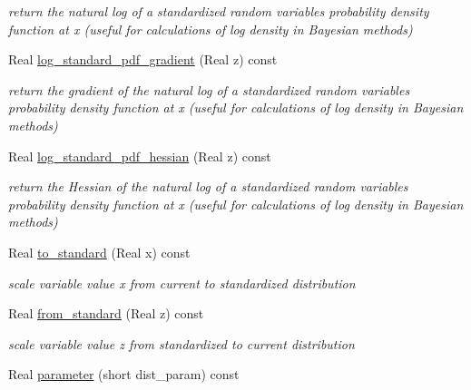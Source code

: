 \begin{DoxyCompactItemize}
\begin{DoxyCompactList}\small\item\em return the natural log of a standardized random variable\textquotesingle{}s probability density function at x (useful for calculations of log density in Bayesian methods) \end{DoxyCompactList}\item 
Real \hyperlink{classPecos_1_1NormalRandomVariable_a73ea75d51f5415f600bebbca4a9628b7}{log\+\_\+standard\+\_\+pdf\+\_\+gradient} (Real z) const \label{classPecos_1_1NormalRandomVariable_a73ea75d51f5415f600bebbca4a9628b7}

\begin{DoxyCompactList}\small\item\em return the gradient of the natural log of a standardized random variable\textquotesingle{}s probability density function at x (useful for calculations of log density in Bayesian methods) \end{DoxyCompactList}\item 
Real \hyperlink{classPecos_1_1NormalRandomVariable_acf89562740c674e54901e97817f56b69}{log\+\_\+standard\+\_\+pdf\+\_\+hessian} (Real z) const \label{classPecos_1_1NormalRandomVariable_acf89562740c674e54901e97817f56b69}

\begin{DoxyCompactList}\small\item\em return the Hessian of the natural log of a standardized random variable\textquotesingle{}s probability density function at x (useful for calculations of log density in Bayesian methods) \end{DoxyCompactList}\item 
Real \hyperlink{classPecos_1_1NormalRandomVariable_a42e98c7343a1ce031f5481c11476fa73}{to\+\_\+standard} (Real x) const \label{classPecos_1_1NormalRandomVariable_a42e98c7343a1ce031f5481c11476fa73}

\begin{DoxyCompactList}\small\item\em scale variable value x from current to standardized distribution \end{DoxyCompactList}\item 
Real \hyperlink{classPecos_1_1NormalRandomVariable_a05e16ccd21e4fe4f3f74a1a98ae9dc74}{from\+\_\+standard} (Real z) const \label{classPecos_1_1NormalRandomVariable_a05e16ccd21e4fe4f3f74a1a98ae9dc74}

\begin{DoxyCompactList}\small\item\em scale variable value z from standardized to current distribution \end{DoxyCompactList}\item 
Real \hyperlink{classPecos_1_1NormalRandomVariable_aa891dab1ae9a225f493e3a0e5032b778}{parameter} (short dist\+\_\+param) const \label{classPecos_1_1NormalRandomVariable_aa891dab1ae9a225f493e3a0e5032b778}


\end{DoxyCompactItemize}
